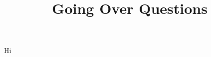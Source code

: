\documentclass{beamer}
\title{Going Over Questions}
\begin{document}
    \begin{frame}
        Hi
    \end{frame}
\end{document}
